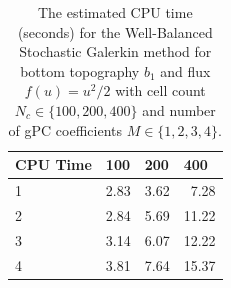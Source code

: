 \documentclass[12pt]{article}
\begin{document}
\begin{table}[!htb]
\centering
\begin{tabular}{@{}l|lll@{}}
\toprule
CPU Time & 100  & 200  & 400   \\ \midrule
1        & 2.83 & 3.62 & \ 7.28  \\
2        & 2.84 & 5.69 & 11.22 \\
3        & 3.14 & 6.07 & 12.22 \\
4        & 3.81 & 7.64 & 15.37 \\ \bottomrule
\end{tabular}
\caption{The estimated CPU time (seconds) for the Well-Balanced Stochastic Galerkin method for bottom topography $b_1$ and flux $f(u) = u^2/2$ with cell count $N_c \in \{100, 200, 400\}$ and number of gPC coefficients $M \in \{1,2,3,4\}$.}
\label{tab:cpu-time}
\end{table}
\end{document}
